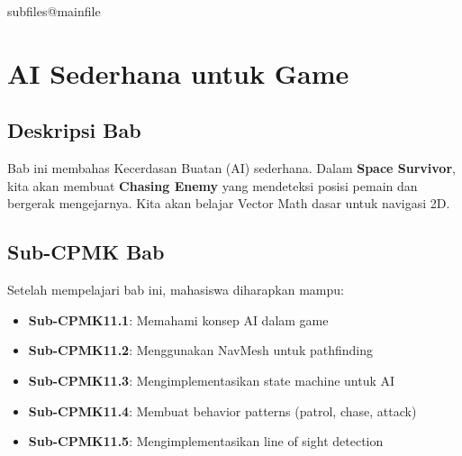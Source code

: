 \documentclass[../../main.tex]{subfiles}
\begin{document}
\ifcsname subfiles@mainfile\endcsname\else
    \setcounter{chapter}{10}
\fi
\chapter{AI Sederhana untuk Game}

\section{Deskripsi Bab}

Bab ini membahas Kecerdasan Buatan (AI) sederhana. 
Dalam \textbf{Space Survivor}, kita akan membuat \textbf{Chasing Enemy} yang mendeteksi posisi pemain dan bergerak mengejarnya. Kita akan belajar Vector Math dasar untuk navigasi 2D.

\section{Sub-CPMK Bab}

Setelah mempelajari bab ini, mahasiswa diharapkan mampu:
\begin{itemize}
\item \textbf{Sub-CPMK11.1}: Memahami konsep AI dalam game
\item \textbf{Sub-CPMK11.2}: Menggunakan NavMesh untuk pathfinding
\item \textbf{Sub-CPMK11.3}: Mengimplementasikan state machine untuk AI
\item \textbf{Sub-CPMK11.4}: Membuat behavior patterns (patrol, chase, attack)
\item \textbf{Sub-CPMK11.5}: Mengimplementasikan line of sight detection
\end{itemize}









\end{document}
